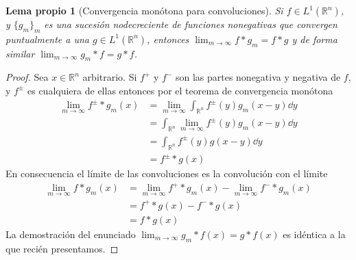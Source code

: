 \documentclass{article}
\newcommand{\realNumbers}{\mathbb{R}}
\newcommand{\integrableFunctions}{L^1(\realNumbers^n)}
\newtheorem{myLemma}{Lema propio}
\theoremstyle{remark}
\begin{document}
  \begin{myLemma}[Convergencia monótona para convoluciones]
    \label{myLemma:convolutionMonotoneConvergence}
    Si \(f \in \integrableFunctions\), y \(\{g_m\}_m\) es una sucesión nodecreciente de funciones nonegativas que convergen puntualmente a una \(g \in \integrableFunctions\), entonces \(\lim_{m \rightarrow \infty} f * g_m =f * g\) y de forma similar \(\lim_{m \rightarrow \infty} g_m * f = g * f\).
  \end{myLemma}
  \begin{proof}
    Sea \(x \in \realNumbers^n\) arbitrario.
    Si \(f^+\) y \(f^-\) son las partes nonegativa y negativa de \(f\), y \(f^{\pm}\) es cualquiera de ellas entonces por el teorema de convergencia monótona
    \begin{align}
      \lim_{m \rightarrow \infty} f^{\pm} * g_m (x)
      &=
      \lim_{m \rightarrow \infty} \int_{\realNumbers^n} f^{\pm}(y)  g_m (x - y) \dd y
      \\
      &=
      \int_{\realNumbers^n} \lim_{m \rightarrow \infty} f^{\pm}(y)  g_m (x - y) \dd y
      \\
      &=
      \int_{\realNumbers^n} f^{\pm}(y) g(x - y) \dd y
      \\
      &=
      f^{\pm} * g (x)
    \end{align}
    En consecuencia el límite de las convoluciones es la convolución con el límite
    \begin{align}
      \lim_{m \rightarrow \infty} 
        f * g_m (x)
      &=
      \lim_{m \rightarrow \infty}
        f^+ * g_m (x)
      - \lim_{m \rightarrow \infty}
        f^- * g_m (x)
      \\
      &=
      f^+ * g (x) - f^- * g (x)
      \\
      &=
      f * g (x)
    \end{align}
    La demostración del enunciado
    \(
      \lim_{m \rightarrow \infty} 
        g_m * f (x)
      =
      g * f (x)
    \)
    es idéntica a la que recién presentamos.
  \end{proof}
\end{document}
